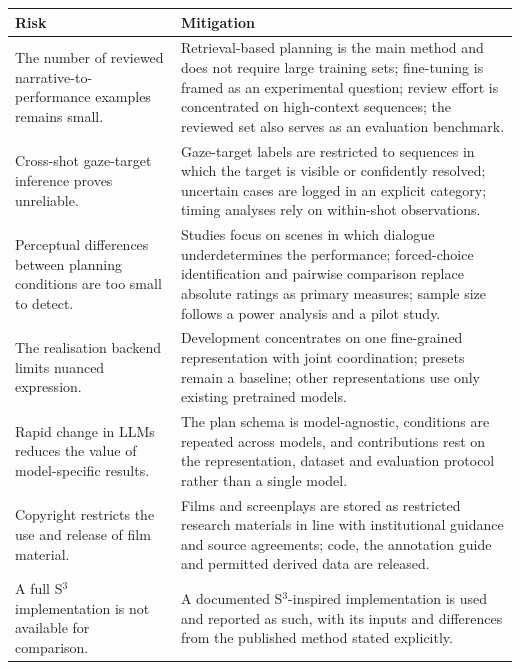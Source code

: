 \documentclass[11pt,a4paper]{article}
\begin{document}
\begin{center}
\small
\begin{tabularx}{\textwidth}{>{\raggedright\arraybackslash}p{}X}
\toprule
\textbf{Risk} & \textbf{Mitigation} \\
\midrule
The number of reviewed narrative-to-performance examples remains small. & Retrieval-based planning is the main method and does not require large training sets; fine-tuning is framed as an experimental question; review effort is concentrated on high-context sequences; the reviewed set also serves as an evaluation benchmark. \\
\addlinespace
Cross-shot gaze-target inference proves unreliable. & Gaze-target labels are restricted to sequences in which the target is visible or confidently resolved; uncertain cases are logged in an explicit category; timing analyses rely on within-shot observations. \\
\addlinespace
Perceptual differences between planning conditions are too small to detect. & Studies focus on scenes in which dialogue underdetermines the performance; forced-choice identification and pairwise comparison replace absolute ratings as primary measures; sample size follows a power analysis and a pilot study. \\
\addlinespace
The realisation backend limits nuanced expression. & Development concentrates on one fine-grained representation with joint coordination; presets remain a baseline; other representations use only existing pretrained models. \\
\addlinespace
Rapid change in LLMs reduces the value of model-specific results. & The plan schema is model-agnostic, conditions are repeated across models, and contributions rest on the representation, dataset and evaluation protocol rather than a single model. \\
\addlinespace
Copyright restricts the use and release of film material. & Films and screenplays are stored as restricted research materials in line with institutional guidance and source agreements; code, the annotation guide and permitted derived data are released. \\
\addlinespace
A full S$^3$ implementation is not available for comparison. & A documented S$^3$-inspired implementation is used and reported as such, with its inputs and differences from the published method stated explicitly. \\
\bottomrule
\end{tabularx}
\end{center}
\end{document}
